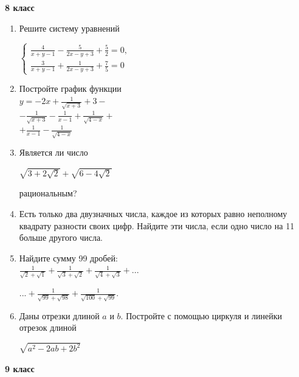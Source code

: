 \documentclass[a4paper,9pt]{article}
\begin{document}
\begin{multicols}{3}
\textbf{8 класс}

\begin{enumerate}
    \item Решите систему уравнений
    \begin{center}
        \(\begin{cases}
            \frac{4}{x+y-1}-\frac{5}{2x-y+3}+\frac{5}{2}=0,\\[0.5em]
            \frac{3}{x+y-1}+\frac{1}{2x-y+3}+\frac{7}{5}=0
        \end{cases}\)
    \end{center}
    \item Постройте график функции \\[0.5em]
    \(y=-2x+\frac{1}{\sqrt{x+3}}+3-\)\\[0.5em]
    \(-\frac{1}{\sqrt{x+3}}-\frac{1}{x-1}+\frac{1}{\sqrt{4-x}}+\)\\[0.5em]
    \(+\frac{1}{x-1}-\frac{1}{\sqrt{4-x}}\)
    \item Является ли число
    \begin{center}
        \(\sqrt{3+2\sqrt{2}}+\sqrt{6-4\sqrt{2}}\) \\[0.5em]
    \end{center}
    рациональным?
    \item Есть только два двузначных числа, каждое из которых равно неполному квадрату разности своих цифр. Найдите эти числа, если одно число на 11 больше другого числа.
    \item Найдите сумму 99 дробей: \\[0.5 em]
    \(\frac{1}{\sqrt{2}+\sqrt{1}}+\frac{1}{\sqrt{3}+\sqrt{2}}+\frac{1}{\sqrt{4}+\sqrt{3}}+...\)
    \begin{center}
        \(...+\frac{1}{\sqrt{99}+\sqrt{98}}+\frac{1}{\sqrt{100}+\sqrt{99}}\).
    \end{center}
    \item Даны отрезки длиной \(a\) и \(b\). Постройте с помощью циркуля и линейки отрезок длиной
    \begin{center}
        \(\sqrt{a^2-2ab+2b^2}\)
    \end{center}
\end{enumerate}

\textbf{9 класс}


\end{multicols}
\end{document}

